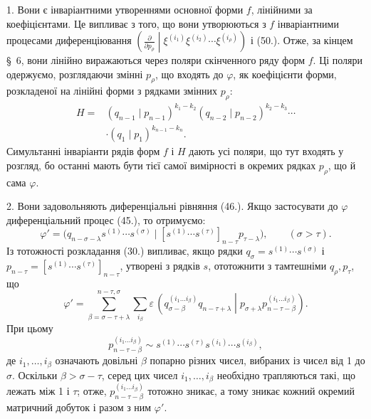 \documentclass[11pt]{article}
\newcommand{\pair}[2]{\left(#1\middle|#2\right)}
\newcommand{\eps}{\varepsilon}
\begin{document}
1. Вони є інваріантними утвореннями основної форми $f$, лінійними за коефіцієнтами. Це випливає з того, що вони утворюються з $f$ інваріантними процесами диференціювання
$\left(\frac{\partial}{\partial p_\rho}\middle|\xi^{(i_1)}\xi^{(i_2)}\cdots\xi^{(i_\rho)}\right)$ і (50.). Отже, за кінцем \S\ 6, вони лінійно виражаються через поляри скінченного ряду форм $f$. Ці поляри одержуємо, розглядаючи змінні $p_\rho$, що входять до $\varphi$, як коефіцієнти форми, розкладеної на лінійні форми з рядками змінних $p_\rho$:
\begin{equation}
\begin{aligned}
 H={}&(q_{n-1}\mid p_{n-1})^{k_1-k_2}
(q_{n-2}\mid p_{n-2})^{k_2-k_3}\cdots\\
&\cdot(q_1\mid p_1)^{k_{n-1}-k_n}.
\end{aligned}
\tag{52}
\end{equation}
Симультанні інваріанти рядів форм $f$ і $H$ дають усі поляри, що тут входять у розгляд, бо останні мають бути тієї самої вимірності в окремих рядках $p_\rho$, що й сама $\varphi$.

2. Вони задовольняють диференціальні рівняння (46.). Якщо застосувати до $\varphi$ диференціальний процес (45.), то отримуємо:
\[
 \varphi'=\bigl(q_{n-\sigma-\lambda}s^{(1)}\cdots s^{(\sigma)}\mid [s^{(1)}\cdots s^{(\tau)}]_{n-\tau}p_{\tau-\lambda}\bigr),\qquad (\sigma>\tau).
\]
Із тотожності розкладання (30.) випливає, якщо рядки $q_\sigma=s^{(1)}\cdots s^{(\sigma)}$ і $p_{n-\tau}=[s^{(1)}\cdots s^{(\tau)}]_{n-\tau}$, утворені з рядків $s$, ототожнити з тамтешніми $q_\rho,p_\tau$, що
\[
 \varphi'=\sum_{\beta=\sigma-\tau+\lambda}^{n-\tau,\sigma}\sum_{i_\beta}\eps\,
 \pair{q_{\sigma-\beta}^{(i_1\ldots i_\beta)}q_{n-\tau+\lambda}}{p_{\sigma+\lambda}p_{n-\tau-\beta}^{(i_1\ldots i_\beta)}}.
\]
При цьому
\[
 p_{n-\tau-\beta}^{(i_1\ldots i_\beta)}\sim s^{(1)}\cdots s^{(\tau)}s^{(i_1)}\cdots s^{(i_\beta)},
\]
де $i_1,\ldots,i_\beta$ означають довільні $\beta$ попарно різних чисел, вибраних із чисел від 1 до $\sigma$. Оскільки $\beta>\sigma-\tau$, серед цих чисел $i_1,\ldots,i_\beta$ необхідно трапляються такі, що лежать між 1 і $\tau$; отже, $p_{n-\tau-\beta}^{(i_1\ldots i_\beta)}$ тотожно зникає, а тому зникає кожний окремий матричний добуток і разом з ним $\varphi'$.
\end{document}
